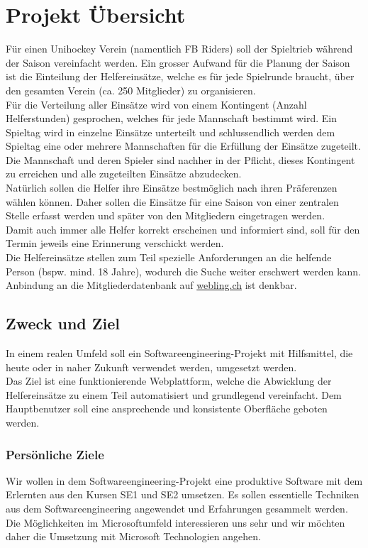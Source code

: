 \chapter{Projekt Übersicht}
Für einen Unihockey Verein (namentlich FB Riders) soll der Spieltrieb während der Saison vereinfacht werden. Ein grosser Aufwand für die Planung der Saison ist die Einteilung der Helfereinsätze, welche es für jede Spielrunde braucht, über den gesamten Verein (ca. 250 Mitglieder) zu organisieren.
\\

Für die Verteilung aller Einsätze wird von einem Kontingent (Anzahl Helferstunden) gesprochen, welches für jede Mannschaft bestimmt wird. Ein Spieltag wird in einzelne Einsätze unterteilt und schlussendlich werden dem Spieltag eine oder mehrere Mannschaften für die Erfüllung der Einsätze zugeteilt. Die Mannschaft und deren Spieler sind nachher in der Pflicht, dieses Kontingent zu erreichen und alle zugeteilten Einsätze abzudecken.
\\
Natürlich sollen die Helfer ihre Einsätze bestmöglich nach ihren Präferenzen wählen können. Daher sollen die Einsätze für eine Saison von einer zentralen Stelle erfasst werden und später von den Mitgliedern eingetragen werden.
\\
Damit auch immer alle Helfer korrekt erscheinen und informiert sind, soll für den Termin jeweils eine Erinnerung verschickt werden. 
\\
Die Helfereinsätze stellen zum Teil spezielle Anforderungen an die helfende Person (bspw. mind. 18 Jahre), wodurch die Suche weiter erschwert werden kann. 
\\
Anbindung an die Mitgliederdatenbank auf \href{http://www.webling.ch/}{webling.ch} ist denkbar. 

\section{Zweck und Ziel}
In einem realen Umfeld soll ein Softwareengineering-Projekt mit Hilfsmittel, die heute oder in naher Zukunft verwendet werden, umgesetzt werden. 
\\
Das Ziel ist eine funktionierende Webplattform, welche die Abwicklung der Helfereinsätze zu einem Teil automatisiert und grundlegend vereinfacht. Dem Hauptbenutzer soll eine ansprechende und konsistente Oberfläche geboten werden.

\subsection{Persönliche Ziele}
Wir wollen in dem Softwareengineering-Projekt eine produktive Software mit dem Erlernten aus den Kursen SE1 und SE2 umsetzen. Es sollen essentielle Techniken aus dem Softwareengineering angewendet und Erfahrungen gesammelt werden. Die Möglichkeiten im Microsoftumfeld interessieren uns sehr und wir möchten daher die Umsetzung mit Microsoft Technologien angehen.

